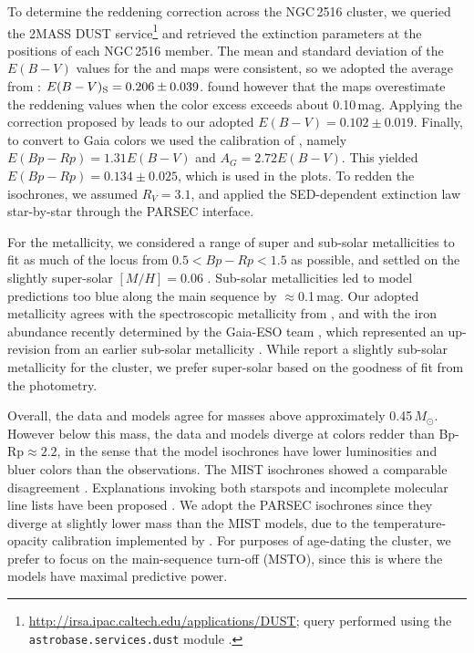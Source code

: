 \documentclass[12pt,twocolumn,tighten]{aastex63}
\begin{document}
To determine the reddening correction across the NGC\,2516 cluster, we
queried the 2MASS
DUST
service\footnote{
	\url{http://irsa.ipac.caltech.edu/applications/DUST};
	query performed using the \texttt{astrobase.services.dust} module
	\citep{bhatti_astrobase_2018}.
}
and retrieved the extinction parameters at the positions of each
NGC\,2516 member.  The mean and standard
deviation of the $E(B-V)$ values for the \citet{schlegel_maps_1998}
and \citet{schlafly_measuring_2011} maps were consistent, so we
adopted the average from \citet{schlegel_maps_1998}: $E(B-V)_{\rm
S}=0.206\pm0.039$.  \citet{bonifacio_search_2000} found however that
the \citet{schlegel_maps_1998} maps overestimate the reddening values
when the color excess exceeds about 0.10\,mag. Applying the correction
proposed by \citet{bonifacio_search_2000} leads to our adopted
$E(B-V)=0.102\pm0.019$.  Finally, to convert to Gaia colors we used
the calibration of \citet{stassun_TIC8_2019}, namely $E(Bp-Rp)=1.31
E(B-V)$ and $A_G=2.72 E(B-V)$.  This yielded $E(Bp-Rp)=0.134\pm0.025$,
which is used in the plots.  To redden the isochrones, we assumed
$R_V=3.1$, and applied the \citet{odonnell_1994} SED-dependent
extinction law star-by-star through the PARSEC interface. 

For the metallicity, we considered a range of super and sub-solar
metallicities to fit as much of the locus from $0.5<Bp-Rp<1.5$ as
possible, and settled on the slightly super-solar $[M/H]=0.06$
\citep{cummings_2011_li_iron}.  Sub-solar metallicities led to model
predictions too blue along the main sequence by $\approx$0.1\,mag.
Our adopted metallicity agrees with the spectroscopic metallicity from
\citet[][Sec~4.4.4]{cummings_2011_li_iron}, and with the iron
abundance recently determined by the Gaia-ESO team
\citep{baratella_gaiaeso_2020}, which represented an up-revision from
an earlier sub-solar metallicity \citep{randich_gaiaeso_2018}.  While
\citet{bailey_rv_2018} report a slightly sub-solar metallicity for the
cluster, we prefer super-solar based on the goodness of fit from the
photometry.

Overall, the data and models agree for masses above approximately
0.45\,$M_\odot$.  However below this mass, the data and models diverge
at colors redder than Bp-Rp$\approx2.2$, in the sense that the model
isochrones have lower luminosities and bluer colors than the
observations.  The MIST isochrones showed a comparable disagreement
\citep{choi_mesa_2016}.  Explanations invoking both starspots and
incomplete molecular line lists have been proposed \citep[{\it
e.g.},][]{stauffer_why_2003,feiden_magnetic_2013,rajpurohit_effective_2013,mann_spectrothermometry_2013,choi_mesa_2016}.
We adopt the PARSEC isochrones since they diverge at slightly lower
mass than the MIST models, due to the temperature-opacity calibration
implemented by \citet{chen_improving_2014}.  For purposes of
age-dating the cluster, we prefer to focus on the main-sequence
turn-off (MSTO), since this is where the models have maximal predictive
power.
\end{document}
